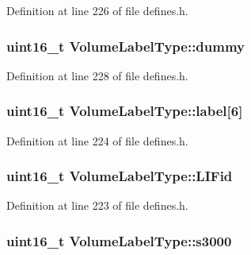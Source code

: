 Definition at line 226 of file defines.\+h.

\subsubsection[{\texorpdfstring{dummy}{dummy}}]{\setlength{\rightskip}{0pt plus 5cm}uint16\+\_\+t Volume\+Label\+Type\+::dummy}\hypertarget{structVolumeLabelType_affbd520c08374524f13708acc05f3f4e}{}\label{structVolumeLabelType_affbd520c08374524f13708acc05f3f4e}


Definition at line 228 of file defines.\+h.

\subsubsection[{\texorpdfstring{label}{label}}]{\setlength{\rightskip}{0pt plus 5cm}uint16\+\_\+t Volume\+Label\+Type\+::label\mbox{[}6\mbox{]}}\hypertarget{structVolumeLabelType_a265fc834b203868cc48482a8be64f60c}{}\label{structVolumeLabelType_a265fc834b203868cc48482a8be64f60c}


Definition at line 224 of file defines.\+h.

\subsubsection[{\texorpdfstring{L\+I\+Fid}{LIFid}}]{\setlength{\rightskip}{0pt plus 5cm}uint16\+\_\+t Volume\+Label\+Type\+::\+L\+I\+Fid}\hypertarget{structVolumeLabelType_a16bdde2d19114ac3238477c29fe75b4a}{}\label{structVolumeLabelType_a16bdde2d19114ac3238477c29fe75b4a}


Definition at line 223 of file defines.\+h.

\subsubsection[{\texorpdfstring{s3000}{s3000}}]{\setlength{\rightskip}{0pt plus 5cm}uint16\+\_\+t Volume\+Label\+Type\+::s3000}\hypertarget{structVolumeLabelType_ac7659e37fbb2bcb0b66c0a0172f9b16c}{}\label{structVolumeLabelType_ac7659e37fbb2bcb0b66c0a0172f9b16c}


